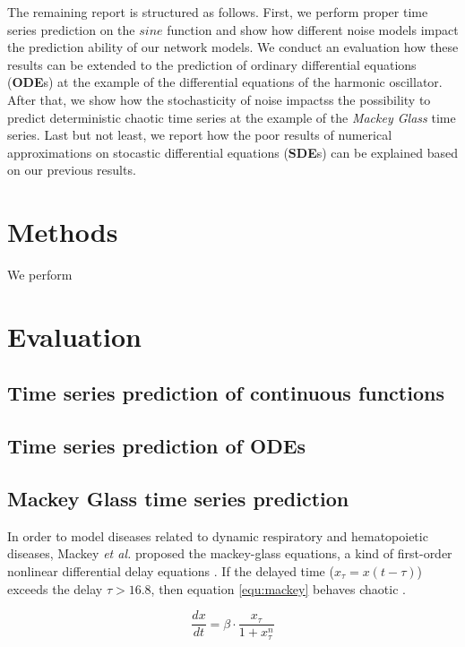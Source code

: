 \documentclass{article}
\begin{document}
The remaining report is structured as follows. First, we perform proper time 
series prediction on the $sine$ function and show how different noise models
impact the prediction ability of our network models. We conduct an evaluation
how these results can be extended to the prediction of 
ordinary differential equations (\textbf{ODE}s) at the example of the 
differential equations of the harmonic oscillator. After that, we show how the
stochasticity of noise impactss the possibility to predict deterministic
chaotic time series at the example of the \emph{Mackey Glass} time series. Last
but not least, we report how the poor results of numerical approximations on 
stocastic differential equations (\textbf{SDE}s) can be explained based on our
previous results.

\section{Methods}

We perform 

\section{Evaluation}
\subsection{Time series prediction of continuous functions}
\label{sec:sine}

\subsection{Time series prediction of ODEs}
 
\subsection{Mackey Glass time series prediction}

In order to model diseases related to dynamic respiratory and hematopoietic 
diseases, Mackey \textit{et al.} proposed the mackey-glass equations, a kind of 
first-order nonlinear differential delay equations \cite{mackey1977}. If the 
delayed time ($x_{\tau} = x(t - \tau)$) exceeds the delay $\tau > 16.8$, then 
equation \ref{equ:mackey} behaves chaotic \cite{farmer1982}.

\begin{equation}
  \frac{dx}{dt} = \beta \cdot \frac{x_{\tau}}{1 + x_{\tau}^n}
  \label{equ:mackey}
\end{equation}
\end{document}
